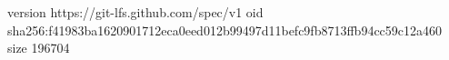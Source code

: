 version https://git-lfs.github.com/spec/v1
oid sha256:f41983ba1620901712eca0eed012b99497d11befc9fb8713ffb94cc59c12a460
size 196704
